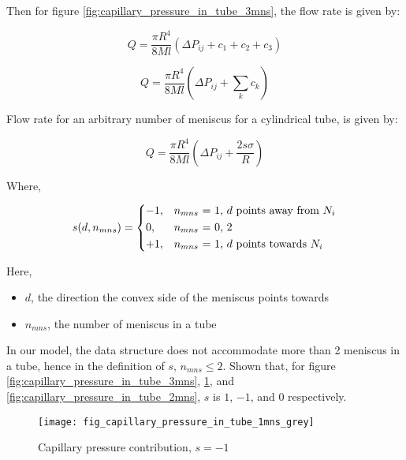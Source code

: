 	Then for figure \ref{fig:capillary_pressure_in_tube_3mns}, the flow rate is given by:
	
	\begin{equation}
		Q = \frac{\pi R^4}{8Ml} \left( \Delta P_{ij} + c_1 + c_2 + c_3 \right)
	\end{equation}
	
	\begin{equation}
		Q = \frac{\pi R^4}{8Ml} \left( \Delta P_{ij} + \sum_{k} c_{k} \right)
	\end{equation}
	
	Flow rate for an arbitrary number of meniscus for a cylindrical tube, is given by:
	
	\begin{equation} \label{eq:main-flow-rate-with-s}
		\boxed{Q = \frac{\pi R^4}{8Ml} \left( \Delta P_{ij} + \frac{2s \sigma}{R} \right)}
	\end{equation}
	
	Where,
	
	\begin{equation} \label{eq:sign-func-def}
		s(d, n_{mns}) = 
		\begin{dcases}
			-1,&\text{$n_{mns}$ = 1, $d$ points away from $N_{i}$}\\
			0,&\text{$n_{mns}$ = 0, 2}\\
			+1,&\text{$n_{mns}$ = 1, $d$ points towards $N_{i}$}
		\end{dcases}
	\end{equation}
	
	Here,
	\begin{itemize}
		\item $d$, the direction the convex side of the meniscus points towards
		\item $n_{mns}$, the number of meniscus in a tube
	\end{itemize}
	
	In our model, the data structure does not accommodate more than 2 meniscus in a tube, hence in the definition of $s$, $n_{mns} \le 2$. Shown that, for figure \ref{fig:capillary_pressure_in_tube_3mns}, \ref{fig:capillary_pressure_in_tube_1mns_grey}, and \ref{fig:capillary_pressure_in_tube_2mns}, $s$ is $1$, $-1$, and $0$ respectively.
	
	\begin{figure}[H]
		\centering
		\texttt{[image: fig\_capillary\_pressure\_in\_tube\_1mns\_grey]}
		\caption{Capillary pressure contribution, $s = -1$}
		\label{fig:capillary_pressure_in_tube_1mns_grey}
	\end{figure}
	

